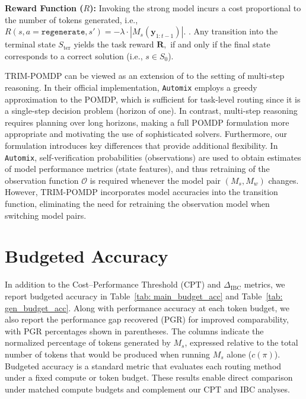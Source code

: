 \documentclass{article}
\theoremstyle{plain}
\theoremstyle{definition}
\theoremstyle{remark}
\newcommand{\regen}{\mathtt{regenerate}}
\begin{document}
\textbf{Reward Function ($R$):} Invoking the strong model incurs a cost proportional to the number of tokens generated, i.e., $R(s,a=\regen, s') =  -\lambda\cdot |M_s(\mathbf{y}_{1:t-1})|.$ 
. Any transition into the terminal state $S_{\mathrm{ter}}$ yields the task reward $\mathbf{R},$ if and only if the final state corresponds to a correct solution (i.e., $s \in S_0$).


TRIM-POMDP can be viewed as an extension of \citet{automix} to the setting of multi-step reasoning.
In their official implementation, \texttt{Automix} employs a greedy approximation to the POMDP, which is sufficient for task-level routing since it is a single-step decision problem (horizon of one). In contrast, multi-step reasoning requires planning over long horizons, making a full POMDP formulation more appropriate and motivating the use of sophisticated solvers. Furthermore, our formulation introduces key differences that provide additional flexibility. In \texttt{Automix}, self-verification probabilities (observations) are used to obtain estimates of model performance metrics (state features), and thus retraining of the observation function $\mathcal{O}$ is required whenever the model pair $(M_s, M_w)$ changes. However, TRIM-POMDP incorporates model accuracies into the transition function, eliminating the need for retraining the observation model when switching model pairs. 

\section{Budgeted Accuracy}
\label{sec:budgeted_acc}
In addition to the Cost–Performance Threshold ($\mathrm{CPT}$) and $\Delta_{\text{IBC}}$ metrics, we report budgeted accuracy in Table~\ref{tab: main_budget_acc} and Table~\ref{tab: gen_budget_acc}. Along with performance accuracy at each token budget, we also report the performance gap recovered ($\mathrm{PGR}$) for improved comparability, with $\mathrm{PGR}$ percentages shown in parentheses. The columns indicate the normalized percentage of tokens generated by $M_s$, expressed relative to the total number of tokens that would be produced when running $M_s$ alone ($c(\pi)$). Budgeted accuracy is a standard metric that evaluates each routing method under a fixed compute or token budget. These results enable direct comparison under matched compute budgets and complement our CPT and IBC analyses.
\end{document}
